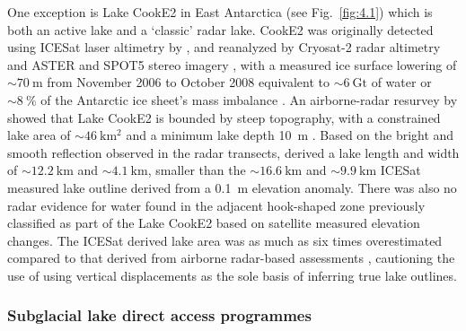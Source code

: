 One exception is Lake CookE2 in East Antarctica (see Fig.~\ref{fig:4.1}) which is both an active lake and a `classic' radar lake.
CookE2 was originally detected using ICESat laser altimetry by \citet{Smithinventoryactivesubglacial2009}, and reanalyzed by Cryosat-2 radar altimetry \citep{McMillanThreedimensionalmappingCryoSat22013} and ASTER and SPOT5 stereo imagery \citep{FlamentCascadingwaterWilkes2014}, with a measured ice surface lowering of $\sim\SI{70}{\metre}$ from November 2006 to October 2008 equivalent to $\sim\SI{6}{\giga\tonne}$ of water or $\sim\SI{8}{\percent}$ of the Antarctic ice sheet's mass imbalance \citep{ShepherdReconciledEstimateIceSheet2012}.
An airborne-radar resurvey by \citet{LiRadarSoundingConfirms2020} showed that Lake CookE2 is bounded by steep topography, with a constrained lake area of $\sim\SI{46}{\kilo\metre\squared}$ and a minimum lake depth \SI{10}{\metre} \citep{GormanPenetrationAntarcticsubglacial1999}.
Based on the bright and smooth reflection observed in the radar transects, \citet{LiRadarSoundingConfirms2020} derived a lake length and width of $\sim\SI{12.2}{\kilo\metre}$ and $\sim\SI{4.1}{\kilo\metre}$, smaller than the $\sim\SI{16.6}{\kilo\metre}$ and $\sim\SI{9.9}{\kilo\metre}$ ICESat measured lake outline \citep{Smithinventoryactivesubglacial2009} derived from a \SI{0.1}{\metre} elevation anomaly.
There was also no radar evidence for water found in the adjacent hook-shaped zone previously classified as part of the Lake CookE2 based on satellite measured elevation changes.
The ICESat derived lake area was as much as six times overestimated compared to that derived from airborne radar-based assessments \citep{LiRadarSoundingConfirms2020}, cautioning the use of using vertical displacements as the sole basis of inferring true lake outlines.



\subsubsection{Subglacial lake direct access programmes}

